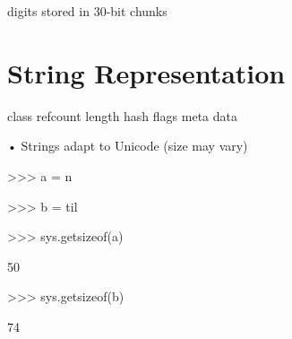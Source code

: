 \documentclass[
  letterpaper,
  DIV=11,
  numbers=noendperiod]{scrreprt}
\newenvironment{Shaded}{\begin{snugshade}}{\end{snugshade}}
\newcommand{\NormalTok}[1]{\textcolor[rgb]{0.00,0.23,0.31}{#1}}
\begin{document}
digits stored in 30-bit chunks


\chapter{String Representation}\label{string-representation}

\begin{Shaded}
\begin{Highlighting}[]
\NormalTok{class refcount length hash flags meta data }
\end{Highlighting}
\end{Shaded}

• Strings adapt to Unicode (size may vary)

\begin{Shaded}
\begin{Highlighting}[]
\NormalTok{\textgreater{}\textgreater{}\textgreater{} a = \textquotesingle{}n\textquotesingle{} }
\end{Highlighting}
\end{Shaded}

\begin{Shaded}
\begin{Highlighting}[]
\NormalTok{\textgreater{}\textgreater{}\textgreater{} b = \textquotesingle{}til\textquotesingle{} }
\end{Highlighting}
\end{Shaded}

\begin{Shaded}
\begin{Highlighting}[]
\NormalTok{\textgreater{}\textgreater{}\textgreater{} sys.getsizeof(a) }
\end{Highlighting}
\end{Shaded}

\begin{Shaded}
\begin{Highlighting}[]
\NormalTok{50 }
\end{Highlighting}
\end{Shaded}

\begin{Shaded}
\begin{Highlighting}[]
\NormalTok{\textgreater{}\textgreater{}\textgreater{} sys.getsizeof(b) }
\end{Highlighting}
\end{Shaded}

\begin{Shaded}
\begin{Highlighting}[]
\NormalTok{74 }
\end{Highlighting}
\end{Shaded}
\end{document}
